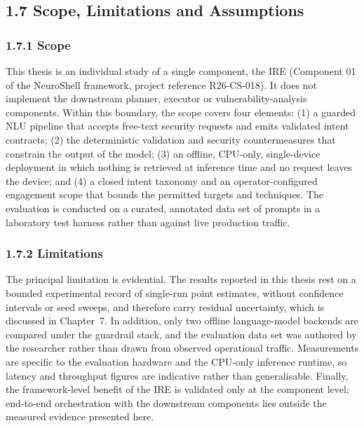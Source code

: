 \documentclass[
]{article}
\begin{document}
\hypertarget{scope-limitations-and-assumptions}{%
\subsection{1.7 Scope, Limitations and
Assumptions}\label{scope-limitations-and-assumptions}}

\hypertarget{scope}{%
\subsubsection{1.7.1 Scope}\label{scope}}

This thesis is an individual study of a single component, the IRE
(Component 01 of the NeuroShell framework, project reference
R26-CS-018). It does not implement the downstream planner, executor or
vulnerability-analysis components. Within this boundary, the scope
covers four elements: (1) a guarded NLU pipeline that accepts free-text
security requests and emits validated intent contracts; (2) the
deterministic validation and security countermeasures that constrain the
output of the model; (3) an offline, CPU-only, single-device deployment
in which nothing is retrieved at inference time and no request leaves
the device; and (4) a closed intent taxonomy and an operator-configured
engagement scope that bounds the permitted targets and techniques. The
evaluation is conducted on a curated, annotated data set of prompts in a
laboratory test harness rather than against live production traffic.

\hypertarget{limitations}{%
\subsubsection{1.7.2 Limitations}\label{limitations}}

The principal limitation is evidential. The results reported in this
thesis rest on a bounded experimental record of single-run point
estimates, without confidence intervals or seed sweeps, and therefore
carry residual uncertainty, which is discussed in Chapter~7. In
addition, only two offline language-model backends are compared under
the guardrail stack, and the evaluation data set was authored by the
researcher rather than drawn from observed operational traffic.
Measurements are specific to the evaluation hardware and the CPU-only
inference runtime, so latency and throughput figures are indicative
rather than generalisable. Finally, the framework-level benefit of the
IRE is validated only at the component level; end-to-end orchestration
with the downstream components lies outside the measured evidence
presented here.
\end{document}
